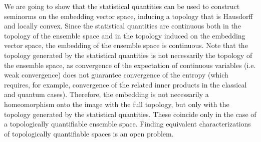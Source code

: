 We are going to show that the statistical quantities can be used to construct seminorms on the embedding vector space, inducing a topology that is Hausdorff and locally convex. Since the statistical quantities are continuous both in the topology of the ensemble space and in the topology induced on the embedding vector space, the embedding of the ensemble space is continuous. Note that the topology generated by the statistical quantities is not necessarily the topology of the ensemble space, as convergence of the expectation of continuous variables (i.e. weak convergence) does not guarantee convergence of the entropy (which requires, for example, convergence of the related inner products in the classical and quantum cases). Therefore, the embedding is not necessarily a homeomorphism onto the image with the full topology, but only with the topology generated by the statistical quantities. These coincide only in the case of a topologically quantifiable ensemble space. Finding equivalent characterizations of topologically quantifiable spaces is an open problem.

